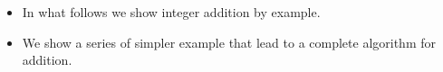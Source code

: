 \begin{frame}
\begin{itemize}
\item In what follows we show integer addition by example.
\item<2-> We show a series of simpler example that lead to a complete algorithm for addition.
\end{itemize}
\end{frame}